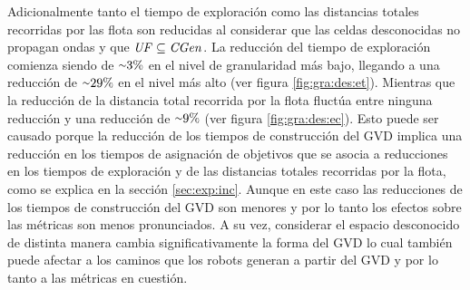 Adicionalmente tanto el tiempo de exploración como las distancias totales
recorridas por las flota son reducidas al considerar que las celdas
desconocidas no propagan ondas y que $\mathit{UF} \subseteq \mathit{CGen}$. La
reducción del tiempo de exploración comienza siendo de ${\smallsim}3\%$ en el
nivel de granularidad más bajo, llegando a una reducción de ${\smallsim}29\%$
en el nivel más alto (ver figura \ref{fig:gra:des:et}). Mientras que la reducción de la distancia total recorrida
por la flota fluctúa entre ninguna reducción y una reducción de
${\smallsim}9\%$ (ver figura \ref{fig:gra:des:ec}). Esto puede ser causado porque la reducción de los tiempos de
construcción del GVD implica una reducción en los tiempos de asignación de
objetivos que se asocia a reducciones en los tiempos de exploración y de
las distancias totales recorridas por la flota, como se explica en la sección
\ref{sec:exp:inc}. Aunque en este caso las reducciones de los tiempos de construcción del
GVD son menores y por lo tanto los efectos sobre las métricas son menos
pronunciados. A su vez, considerar el espacio desconocido de distinta manera
cambia significativamente la forma del GVD lo cual también puede afectar a los
caminos que los robots generan a partir del GVD y por lo tanto a las métricas en cuestión.



